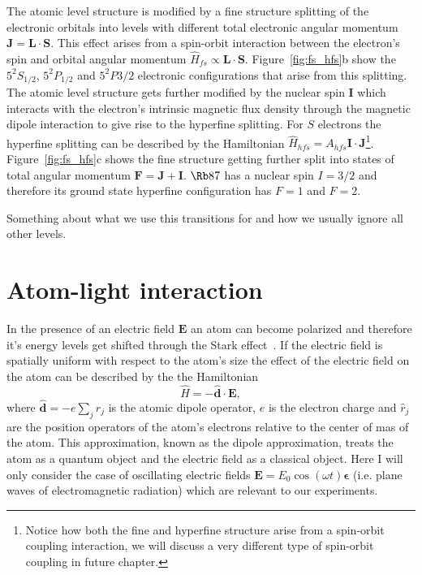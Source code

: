 The atomic level structure is modified by a fine structure splitting of the electronic orbitals into levels with different total electronic angular momentum $\mathbf{J}=\mathbf{L}\cdot\mathbf{S}$. This effect  arises from a spin-orbit interaction between the electron's spin and orbital angular momentum $\hat H_{fs} \propto \mathbf{L}\cdot\mathbf{S}$. Figure~\ref{fig:fs_hfs}b show the $5^2S_{1/2}$, $5^2P_{1/2}$ and $5^2P{3/2}$ electronic configurations that arise from this splitting.  The atomic level structure gets further modified by the nuclear spin $\mathbf{I}$ which interacts with the electron's intrinsic magnetic flux density through the magnetic dipole interaction to give rise to the hyperfine splitting. For $S$ electrons the hyperfine splitting can be described by the Hamiltonian $\hat H_{hfs} = A_{hfs}\mathbf{I}\cdot\mathbf{J}$\footnote{Notice how both the fine and hyperfine structure arise from a spin-orbit coupling interaction, we will discuss a very different type of spin-orbit coupling in future chapter.}. Figure~\ref{fig:fs_hfs}c shows the fine structure getting further split into states of total angular momentum $\mathbf{F}=\mathbf{J}+\mathbf{I}$. $\Rb87$ has a nuclear spin $I=3/2$ and therefore its ground state hyperfine configuration has $F=1$ and $F=2$. 


Something about what we use this transitions for and how we usually ignore all other levels. 


\section{Atom-light interaction}
In the presence of an electric field $\mathbf E$ an atom can become polarized and therefore it's energy levels get shifted through the Stark effect~\cite{stark_beobachtungen_1914}. If the electric field is spatially uniform with respect to the atom's size the effect of the electric field on the atom can be described by the the Hamiltonian   
%
\begin{equation}
\hat{H} = -\mathbf{\hat d}\cdot\mathbf{E},
\label{eq:dipole_ham}	
\end{equation}
%
where $\mathbf{\hat d}=-e\sum_j r_j$ is the atomic dipole operator, $e$ is the electron charge and $\hat r_j$ are the position operators of the atom's electrons relative to the center of mas of the atom. This approximation, known as the dipole approximation, treats the atom as a quantum object and the electric field as a classical object. Here I will only consider the case of oscillating electric fields $\mathbf{E}=E_0\cos(\omega t)\boldsymbol{\epsilon}$ (i.e. plane waves of electromagnetic radiation) which are relevant to our experiments. 

